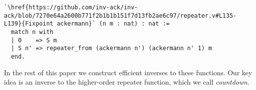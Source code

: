 \begin{lstlisting}
`\href{https://github.com/inv-ack/inv-ack/blob/7270e64a2600b771f2b1b1b151f7d13fb2ae6c97/repeater.v#L135-L139}{Fixpoint ackermann}` (n m : nat) : nat :=
  match n with
  | 0    => S m
  | S n' => repeater_from (ackermann n') (ackermann n' 1) m
  end.
\end{lstlisting}
In the rest of this paper we construct efficient inverses to these
functions.  Our key idea is an inverse to the higher-order repeater function, which we call \emph{countdown}.









